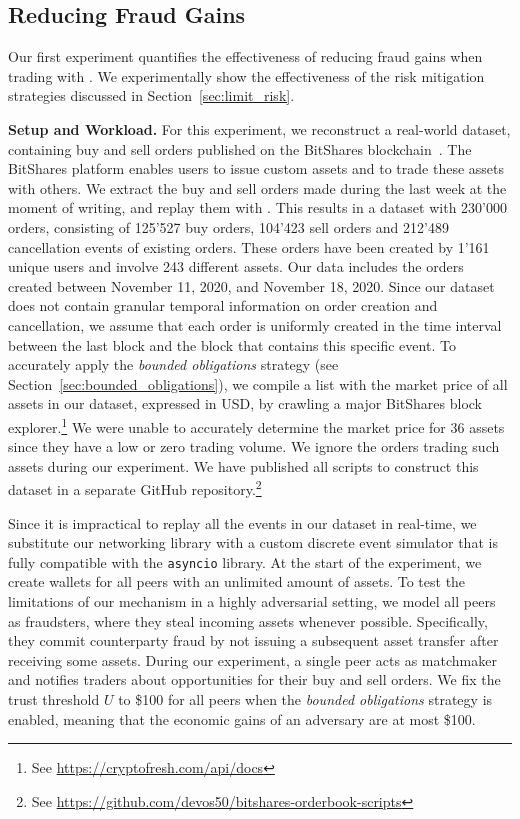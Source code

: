 \subsection{Reducing Fraud Gains}
\label{sec:xchange_fraud_experiment}
Our first experiment quantifies the effectiveness of reducing fraud gains when trading with \ModelName{}.
We experimentally show the effectiveness of the risk mitigation strategies discussed in Section~\ref{sec:limit_risk}.

\textbf{Setup and Workload.}
For this experiment, we reconstruct a real-world dataset, containing buy and sell orders published on the BitShares blockchain~\cite{schuh2015bitshares}.
The BitShares platform enables users to issue custom assets and to trade these assets with others.
We extract the buy and sell orders made during the last week at the moment of writing, and replay them with \ModelName{}.
This results in a dataset with 230'000 orders, consisting of 125'527 buy orders, 104'423 sell orders and 212'489 cancellation events of existing orders.
These orders have been created by 1'161 unique users and involve 243 different assets.
Our data includes the orders created between November 11, 2020, and November 18, 2020.
Since our dataset does not contain granular temporal information on order creation and cancellation, we assume that each order is uniformly created in the time interval between the last block and the block that contains this specific event.
To accurately apply the \emph{bounded obligations} strategy (see Section~\ref{sec:bounded_obligations}), we compile a list with the market price of all assets in our dataset, expressed in USD, by crawling a major BitShares block explorer.\footnote{See \url{https://cryptofresh.com/api/docs}}
We were unable to accurately determine the market price for 36 assets since they have a low or zero trading volume.
We ignore the orders trading such assets during our experiment.
We have published all scripts to construct this dataset in a separate GitHub repository.\footnote{See \url{https://github.com/devos50/bitshares-orderbook-scripts}}

Since it is impractical to replay all the events in our dataset in real-time, we substitute our networking library with a custom discrete event simulator that is fully compatible with the \texttt{asyncio} library.
At the start of the experiment, we create wallets for all peers with an unlimited amount of assets.
To test the limitations of our mechanism in a highly adversarial setting, we model all peers as fraudsters, where they steal incoming assets whenever possible.
Specifically, they commit counterparty fraud by not issuing a subsequent asset transfer after receiving some assets.
During our experiment, a single peer acts as matchmaker and notifies traders about opportunities for their buy and sell orders.
We fix the trust threshold $ U $ to \$100 for all peers when the \emph{bounded obligations} strategy is enabled, meaning that the economic gains of an adversary are at most \$100.

